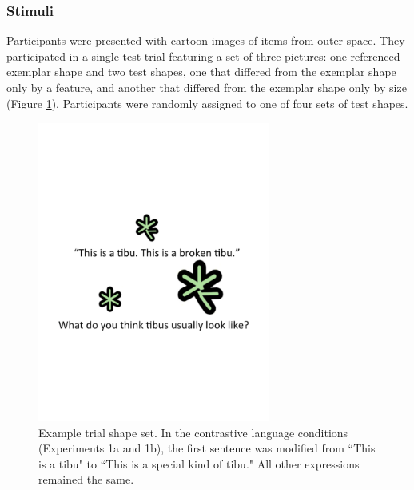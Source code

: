 \documentclass[10pt,letterpaper]{article}
\begin{document}
\subsubsection{Stimuli}

Participants were presented with cartoon images of items from outer space. They participated in a single test trial featuring a set of three pictures: one referenced exemplar shape and two test shapes, one that differed from the exemplar shape only by a feature, and another that differed from the exemplar shape only by size (Figure \ref{fig:demo}).  Participants were randomly assigned to one of four sets of test shapes.  


\begin{figure}[t] 
  \begin{center} 
    \includegraphics[width=3in]{figures/demo.pdf} 
    \caption{\label{fig:demo} Example trial shape set.  In the contrastive language conditions (Experiments 1a and 1b), the first sentence was modified from ``This is a tibu" to ``This is a special kind of tibu."  All other expressions remained the same. }
  \end{center} 
\end{figure}
	
\end{document}
